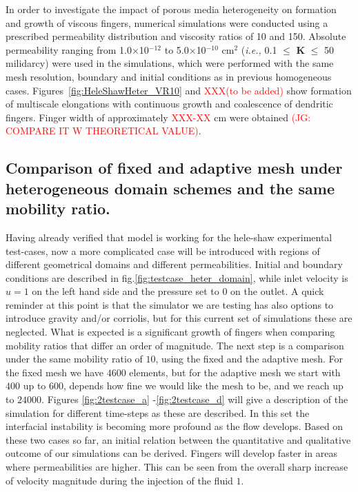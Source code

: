 \documentclass[preprint,authoryear,12pt]{elsarticle}
\newcommand{\red}{\textcolor{red}}
\newcommand{\ie}{{\it i.e., }}
\begin{document}
\medskip
In order to investigate the impact of porous media heterogeneity on formation and growth of viscous fingers, numerical simulations were conducted using a prescribed permeability distribution and viscosity ratios of 10 and 150. Absolute permeability ranging from 1.0$\times$10$^{-12}$ to 5.0$\times$10$^{-10}$ cm$^{2}$ (\ie 0.1 $\le$ {\bf K} $\le$ 50 milidarcy) were used in the simulations, which were performed with the same mesh resolution, boundary and initial conditions as in previous homogeneous cases. Figures~\ref{fig:HeleShawHeter_VR10} and \red{XXX(to be added)} show formation of multiscale elongations with continuous growth and coalescence of dendritic fingers. Finger width of approximately \red{XXX-XX} cm were obtained \red{(JG: COMPARE IT W THEORETICAL VALUE)}.  
   


\subsection{Comparison of fixed and adaptive mesh under heterogeneous domain schemes and the same mobility ratio.}\label{section:results_hete_fix_adapt} 

\medskip
Having already verified that model is working for the hele-shaw experimental test-cases, now a more complicated case will be introduced with regions of different geometrical domains and different permeabilities. Initial and boundary conditions are described in fig.\ref{fig:testcase_heter_domain}, while inlet velocity is $u=1$ on the left hand side and the pressure set to $0$ on the outlet. A quick reminder at this point is that the simulator we are testing has also options to introduce gravity and/or corriolis, but for this current set of simulations these are neglected. What is expected is a significant growth of fingers when comparing mobility ratios that differ an order of magnitude. %
The next step is a comparison under the same mobility ratio of $10$, using the fixed and the adaptive mesh. For the fixed mesh we have $4600$ elements, but for the adaptive mesh we start with $400$ up to $600$, depends how fine we would like the mesh to be, and we reach up to $24000$. %
Figures \ref{fig:2testcase_a}%
-\ref{fig:2testcase_d} will give a description of the simulation for different time-steps as these are described. In this set the interfacial instability is becoming more profound as the flow develops. Based on these two cases so far, an initial relation between the quantitative and qualitative outcome of our simulations can be derived. Fingers will develop faster in areas where permeabilities are higher. This can be seen from the overall sharp increase of velocity magnitude during the injection of the fluid $1$.    
\end{document}
